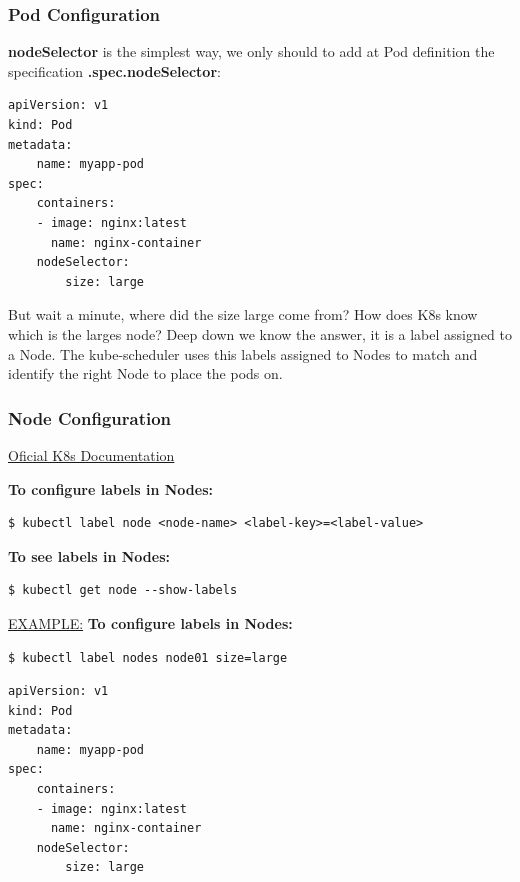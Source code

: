 \documentclass{article}
\newenvironment{codetemplate}[1][]{%
  \mybasecolorbox[#1]
  \itshape
}{%
  \endmybasecolorbox
}
\begin{document}
\subsubsection{Pod Configuration}
\textbf{nodeSelector} is the simplest way, we only should to add at Pod definition the specification \textbf{.spec.nodeSelector}:

\begin{codetemplate}{}
\begin{verbatim}
apiVersion: v1
kind: Pod
metadata:
    name: myapp-pod
spec:
    containers:
    - image: nginx:latest
      name: nginx-container
    nodeSelector:
        size: large
\end{verbatim}
\end{codetemplate}

But wait a minute, where did the size large come from? How does K8s know which is the larges node? Deep down we know the answer, it is a label assigned to a Node. The kube-scheduler uses this labels assigned to Nodes to match and identify the right Node to place the pods on.

\subsubsection{Node Configuration}

\href{https://kubernetes.io/docs/tasks/configure-pod-container/assign-pods-nodes/}{Oficial K8s Documentation}


\textbf{To configure labels in Nodes:}
\begin{codetemplate}{}
\begin{verbatim}
$ kubectl label node <node-name> <label-key>=<label-value>
\end{verbatim}
\end{codetemplate}

\textbf{To see labels in Nodes:}
\begin{codetemplate}{}
\begin{verbatim}
$ kubectl get node --show-labels
\end{verbatim}
\end{codetemplate}

\underline{EXAMPLE:}
\textbf{To configure labels in Nodes:}
\begin{codetemplate}{}
\begin{verbatim}
$ kubectl label nodes node01 size=large
\end{verbatim}
\begin{codetemplate}{}
\begin{verbatim}
apiVersion: v1
kind: Pod
metadata:
    name: myapp-pod
spec:
    containers:
    - image: nginx:latest
      name: nginx-container
    nodeSelector:
        size: large
\end{verbatim}
\end{codetemplate}

\end{codetemplate}
\end{document}
